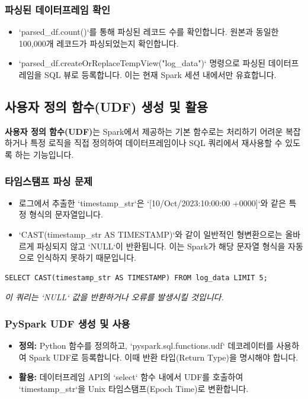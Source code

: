 \documentclass[11pt,a4paper]{article}
\begin{document}
\subsubsection{파싱된 데이터프레임 확인}
\begin{itemize}
    \item `parsed_df.count()`를 통해 파싱된 레코드 수를 확인합니다. 원본과 동일한 100,000개 레코드가 파싱되었는지 확인합니다.
    \item `parsed_df.createOrReplaceTempView("log_data")` 명령으로 파싱된 데이터프레임을 SQL 뷰로 등록합니다. 이는 현재 Spark 세션 내에서만 유효합니다.
\end{itemize}

\subsection{사용자 정의 함수(UDF) 생성 및 활용}

\begin{conceptbox}
\textbf{사용자 정의 함수(UDF)}는 Spark에서 제공하는 기본 함수로는 처리하기 어려운 복잡하거나 특정 로직을 직접 정의하여 데이터프레임이나 SQL 쿼리에서 재사용할 수 있도록 하는 기능입니다.
\end{conceptbox}

\subsubsection{타임스탬프 파싱 문제}
\begin{itemize}
    \item 로그에서 추출한 `timestamp_str`은 `[10/Oct/2023:10:00:00 +0000]`와 같은 특정 형식의 문자열입니다.
    \item `CAST(timestamp_str AS TIMESTAMP)`와 같이 일반적인 형변환으로는 올바르게 파싱되지 않고 `NULL`이 반환됩니다. 이는 Spark가 해당 문자열 형식을 자동으로 인식하지 못하기 때문입니다.
\end{itemize}

\begin{lstlisting}
SELECT CAST(timestamp_str AS TIMESTAMP) FROM log_data LIMIT 5;
\end{lstlisting}
\textit{이 쿼리는 `NULL` 값을 반환하거나 오류를 발생시킬 것입니다.}

\subsubsection{PySpark UDF 생성 및 사용}
\begin{itemize}
    \item \textbf{정의:} Python 함수를 정의하고, `pyspark.sql.functions.udf` 데코레이터를 사용하여 Spark UDF로 등록합니다. 이때 반환 타입(Return Type)을 명시해야 합니다.
    \item \textbf{활용:} 데이터프레임 API의 `select` 함수 내에서 UDF를 호출하여 `timestamp_str`을 Unix 타임스탬프(Epoch Time)로 변환합니다.
\end{itemize}
\end{document}
